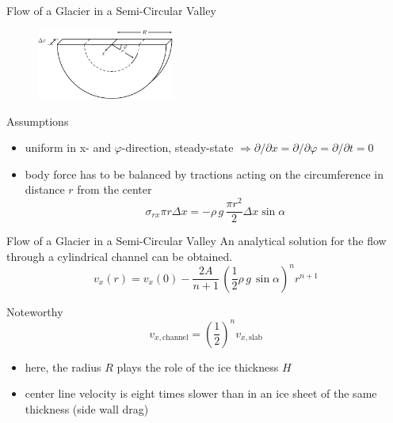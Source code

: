 \documentclass[hide notes,intlimits,unknownkeysallowed]{beamer}
\begin{document}
\begin{frame}{Flow of a Glacier in a Semi-Circular Valley}
  \vspace{-1em}
  \begin{figure}
    \centering
    \includegraphics[width=0.4\textwidth]{fig_channel}
    \label{fig:valley-glacier-coord}
  \end{figure}
  \begin{block}{Assumptions}
    \begin{itemize}
    \item uniform in x- and $\varphi$-direction, steady-state $\Rightarrow \partial / \partial x = \partial / \partial \varphi = \partial / \partial t = 0$
    \item body force has to be balanced by tractions acting on the circumference in distance $r$ from the center
      \begin{equation*}
        \sigma_{rx} \pi r \Delta x = - \rho\,g\,\frac{\pi r^2}{2} \Delta x \sin \alpha
      \end{equation*}
\end{itemize}
  \end{block}
\end{frame}

\begin{frame}{Flow of a Glacier in a Semi-Circular Valley}
 An analytical solution for the flow through a cylindrical channel can be obtained.
\begin{equation*}
v_x (r) = v_x (0) - \frac{2A}{n+1}\,\left( \frac{1}{2}\rho\,g\,\sin\alpha\right)^{n} r^{n+1}
\end{equation*}
\begin{block}{Noteworthy}
\begin{equation*}
v_{x, \text{channel}} = \left(\frac{1}{2}\right)^{n} v_{x, \text{slab}}
\end{equation*}
\begin{itemize}
\item here, the radius $R$ plays the role of the ice thickness $H$
\item center line velocity is \alert{eight} times slower than in an
  ice sheet of the same thickness (side wall drag)
\end{itemize}
\end{block}
\end{frame}
\end{document}
